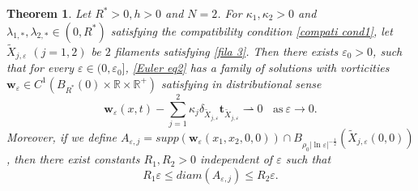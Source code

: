 \documentclass[12pt,reqno]{amsart}
\numberwithin{equation}{section}
\newtheorem{theorem}{Theorem}[section]
\theoremstyle{definition}
\theoremstyle{remark}
\begin{document}
\begin{theorem}\label{thm03}
	Let $ R^*>0 , h>0 $ and $ N=2 $. For $ \kappa_1,\kappa_2>0 $ and $ \lambda_{1,*},\lambda_{2,*}\in (0,R^*) $   satisfying the compatibility condition \eqref{compati cond1},
let $ \tilde{X}_{j,\varepsilon} $ $(j=1,2)$ be $ 2 $ filaments satisfying \eqref{fila 3}. Then  there exists $ \varepsilon_0>0 $, such that for every $ \varepsilon\in(0,\varepsilon_0] $, \eqref{Euler eq2} has a family of solutions with vorticities  $ \mathbf{w}_\varepsilon\in C^1(B_{R^*}(0)\times \mathbb{R}\times\mathbb{R}^+) $ satisfying in distributional sense
	\begin{equation*} 
	\mathbf{w}_\varepsilon(x,t)-  \sum_{j=1}^2\kappa_j\delta_{\tilde{X}_{j,\varepsilon}}\textbf{t}_{\tilde{X}_{j,\varepsilon}}\rightharpoonup0\ \ \ \ \text{as}\ \varepsilon\to0.
	\end{equation*}
	Moreover, if we define   $ A_{\varepsilon,j}=supp\left (\mathbf{w}_\varepsilon(x_1,x_2,0,0)\right ) \cap B_{\rho_0|\ln\varepsilon|^{-\frac{1}{2}}}\left ( \tilde{X}_{j,\varepsilon}(0,0)\right )  $, then there exist constants $ R_1,R_2>0 $ independent of $ \varepsilon $  such that
	\begin{equation*}
	R_1\varepsilon \leq diam(A_{\varepsilon,j})\leq R_2\varepsilon .
	\end{equation*}
\end{theorem}
\end{document}
